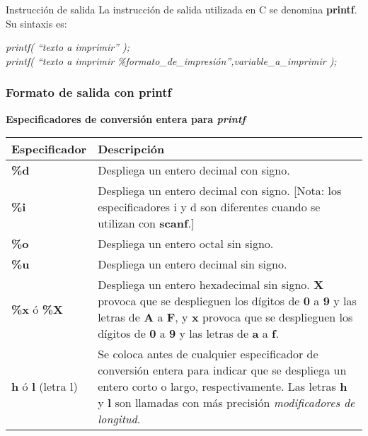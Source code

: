 \begin{frame}{Instrucción de salida}
La instrucción de salida utilizada en C se denomina \textbf{printf}. Su sintaxis es:\\
\vspace{5mm}

{\small \textit{printf( ``texto a imprimir'' );}\\
\textit{printf( ``texto a imprimir \%formato\_de\_impresión'',variable\_a\_imprimir );}}
\end{frame}
\begin{frame}[t]
\frametitle{Formato de salida con printf}
\textbf{Especificadores de conversión entera para \textit{printf}}\\ \vspace{5mm}
\scriptsize
\begin{center}
\begin{tabular}{lp{7.5cm}}
	\toprule
	\textbf{Especificador} & \textbf{Descripción}\\
	\midrule
	\textbf{\%d} & Despliega un entero decimal con signo.\\ 
	\textbf{\%i} & Despliega un entero decimal con signo. [Nota: los especificadores i y d son diferentes cuando se utilizan con \textbf{scanf}.]\\ 
	\textbf{\%o} & Despliega un entero octal sin signo.\\
	\textbf{\%u} & Despliega un entero decimal sin signo. \\
	\textbf{\%x} ó \textbf{\%X} & Despliega un entero hexadecimal sin signo. \textbf{X} provoca que se desplieguen los dígitos de \textbf{0} a \textbf{9} y las letras de \textbf{A} a \textbf{F}, y \textbf{x} provoca que se desplieguen los dígitos de \textbf{0} a \textbf{9} y las letras de \textbf{a} a \textbf{f}.\\ 
	\textbf{h} ó \textbf{l} (letra l) & Se coloca antes de cualquier especificador de conversión entera para indicar que se despliega un entero corto o largo, respectivamente. Las letras \textbf{h} y \textbf{l} son llamadas con más precisión \textit{modificadores de longitud}.\\
	\bottomrule
\end{tabular}
\end{center}
\end{frame}

